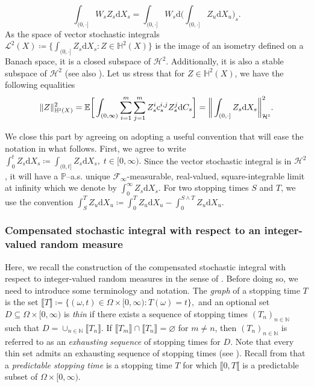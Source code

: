 \documentclass[10pt]{article} %
\newcommand\cF{\mathcal F}
\newcommand\cH{\mathcal H}
\newcommand\cL{\mathcal L}
\newcommand{\smalltext}[1]{\text{\fontsize{4}{4}\selectfont$#1$}}
\def \E{\mathbb{E}}
\def \H{\mathbb{H}}
\def \N{\mathbb{N}}
\def \P{\mathbb{P}}
\newcommand{\1}{\mathbf{1}}
\def\d{\mathrm{d}}
\begin{document}
		\begin{equation*}
			\int_{(0,\cdot]} W_sZ_s \d X_s = \int_{(0,\cdot]} W_s \d \bigg( \int_{(0,\cdot]} Z_u \d X_u \bigg)_s.
		\end{equation*}
As the space of vector stochastic integrals $\cL^2(X) \coloneqq \big\{ \int_{(0,\cdot]} Z_s \d X_s : Z \in \H^2(X) \big\}$ is the image of an isometry defined on a Banach space, it is a closed subspace of $\cH^2$. Additionally, it is also a stable subspace of $\cH^2$ (see also \cite[Definition 4.4 and Theorem 4.35]{jacod1979calcul}). Let us stress that for $Z \in \H^2(X)$, we have the following equalities
\begin{equation*}
	\|Z\|^2_{\H^\smalltext{2}(X)} = \E \bigg[ \int_{(0,\infty)}  \sum_{i=1}^m\sum_{j=1}^m Z^i_s c^{i,j}_s Z^j_s  \d C_s \bigg] = \bigg\| \int_{(0,\cdot]} Z_s \d X_s \bigg\|^2_{\cH^\smalltext{2}}.
\end{equation*}

We close this part by agreeing on adopting a useful convention that will ease the notation in what follows. First, we agree to write $\int_0^t Z_s \d X_s \coloneqq \int_{(0,t]} Z_s \d X_s, \; t \in [0,\infty).$ Since the vector stochastic integral is in $\cH^2$, it will have a $\P$--a.s. unique $\cF_\infty$-measurable, real-valued, square-integrable limit at infinity which we denote by $
 	\int_0^\infty Z_s \d X_s.$ For two stopping times $S$ and $T$, we use the convention $\int_S^T Z_u \d X_u \coloneqq \int_0^T Z_u \d X_u - \int_0^{S\land T} Z_u \d X_u.$

\subsubsection{Compensated stochastic integral with respect to an integer-valued random measure}\label{sec::compensated_si}

Here, we recall the construction of the compensated stochastic integral with respect to integer-valued random measures in the sense of \cite{cohen2015stochastic,jacod1979calcul,jacod2003limit}. Before doing so, we need to introduce some terminology and notation. The \emph{graph} of a stopping time $T$ is the set $\llbracket T \rrbracket \coloneqq \{(\omega,t) \in \Omega \times [0,\infty): T(\omega)= t\},$ and an optional set $D \subseteq \Omega \times [0,\infty)$ is \emph{thin} if there exists a sequence of stopping times $(T_n)_{n \in \N}$ such that $D = \cup_{n \in \N} \llbracket T_n \rrbracket.$ If $\llbracket T_m \rrbracket \cap \llbracket T_n \rrbracket = \varnothing$ for $m \neq n$, then $(T_n)_{n \in \N}$ is referred to as an \emph{exhausting sequence} of stopping times for $D$. Note that every thin set admits an exhausting sequence of stopping times (see \cite[Lemma I.1.31]{jacod2003limit}). Recall from  that a \emph{predictable stopping time} is a stopping time $T$ for which $\llbracket 0,T\llbracket$ is a predictable subset of $\Omega \times [0,\infty)$.
\end{document}
